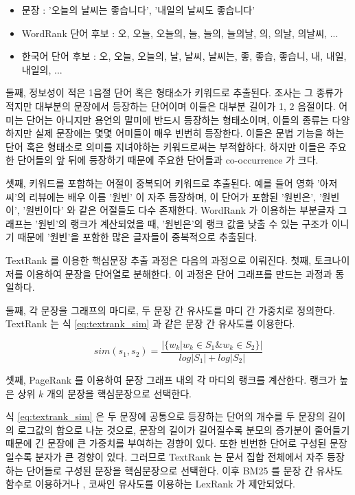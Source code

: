 \documentclass[oneside, ko,phd]{snuthesis_utf8_kor}
\begin{document}
\begin{itemize}
  \item 문장 : '오늘의 날씨는 좋습니다', '내일의 날씨도 좋습니다'
  \item WordRank 단어 후보 : 오, 오늘, 오늘의, 늘, 늘의, 늘의날, 의, 의날, 의날씨, ...
  \item 한국어 단어 후보 : 오, 오늘, 오늘의, 날, 날씨, 날씨는, 좋, 좋습, 좋습니, 내, 내일, 내일의, ...
\end{itemize}

둘째, 정보성이 적은 1음절 단어 혹은 형태소가 키워드로 추출된다.
조사는 그 종류가 적지만 대부분의 문장에서 등장하는 단어이며 이들은 대부분 길이가 1, 2 음절이다.
어미는 단어는 아니지만 용언의 말미에 반드시 등장하는 형태소이며, 이들의 종류는 다양하지만 실제 문장에는 몇몇 어미들이 매우 빈번히 등장한다.
이들은 문법 기능을 하는 단어 혹은 형태소로 의미를 지녀야하는 키워드로써는 부적합하다.
하지만 이들은 주요한 단어들의 앞 뒤에 등장하기 때문에 주요한 단어들과 co-occurrence 가 크다.

셋째, 키워드를 포함하는 어절이 중복되어 키워드로 추출된다.
예를 들어 영화 '아저씨'의 리뷰에는 배우 이름 '원빈' 이 자주 등장하며, 이 단어가 포함된 '원빈은', '원빈이', '원빈이다' 와 같은 어절들도 다수 존재한다.
WordRank 가 이용하는 부분글자 그래프는 '원빈'의 랭크가 계산되었을 때, '원빈은'의 랭크 값을 낮출 수 있는 구조가 이니기 때문에 '원빈'을 포함한 많은 글자들이 중복적으로 추출된다.

TextRank 를 이용한 핵심문장 추출 과정은 다음의 과정으로 이뤄진다.
첫째, 토크나이저를 이용하여 문장을 단어열로 분해한다.
이 과정은 단어 그래프를 만드는 과정과 동일하다.

둘째, 각 문장을 그래프의 마디로, 두 문장 간 유사도를 마디 간 가중치로 정의한다.
TextRank 는 식 \ref{eq:textrank_sim} 과 같은 문장 간 유사도를 이용한다.

\begin{equation}
\label{eq:textrank_sim}
sim(s_1, s_2) = \frac{\vert \{ w_k \vert w_k \in S_1 \& w_k \in S_2 \} \vert}{log \vert S_1 \vert + log \vert S_2 \vert}
\end{equation}

셋째, PageRank \cite{ilprints422} 를 이용하여 문장 그래프 내의 각 마디의 랭크를 계산한다.
랭크가 높은 상위 $k$ 개의 문장을 핵심문장으로 선택한다.

식 \ref{eq:textrank_sim} 은 두 문장에 공통으로 등장하는 단어의 개수를 두 문장의 길이의 로그값의 합으로 나눈 것으로, 문장의 길이가 길어질수록 분모의 증가분이 줄어들기 때문에 긴 문장에 큰 가중치를 부여하는 경향이 있다.
또한 빈번한 단어로 구성된 문장일수록 분자가 큰 경향이 있다.
그러므로 TextRank 는 문서 집합 전체에서 자주 등장하는 단어들로 구성된 문장을 핵심문장으로 선택한다.
이후 BM25 \cite{robertson2009probabilistic} 를 문장 간 유사도 함수로 이용하거나 \cite{barrios2016variations}, 코싸인 유사도를 이용하는 LexRank \cite{erkan2004lexrank} 가 제안되었다.
\end{document}
